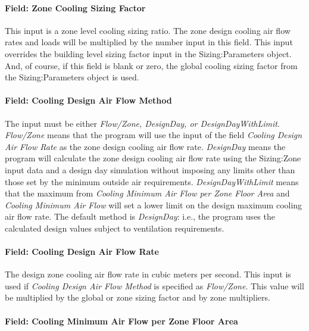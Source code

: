\paragraph{Field: Zone Cooling Sizing Factor}\label{field-zone-cooling-sizing-factor}

This input is a zone level cooling sizing ratio. The zone design cooling air flow rates and loads will be multiplied by the number input in this field. This input overrides the building level sizing factor input in the Sizing:Parameters object. And, of course, if this field is blank or zero, the global cooling sizing factor from the Sizing:Parameters object is used.

\paragraph{Field: Cooling Design Air Flow Method}\label{field-cooling-design-air-flow-method}

The input must be either \emph{Flow/Zone, DesignDay, or DesignDayWithLimit}. \emph{Flow/Zone} means that the program will use the input of the field \emph{Cooling Design Air Flow Rate} as the zone design cooling air flow rate. \emph{DesignDay} means the program will calculate the zone design cooling air flow rate using the Sizing:Zone input data and a design day simulation without imposing any limits other than those set by the minimum outside air requirements. \emph{DesignDayWithLimit} means that the maximum from \emph{Cooling Minimum Air Flow per Zone Floor Area} and \emph{Cooling Minimum Air Flow} will set a lower limit on the design maximum cooling air flow rate. The default method is \emph{DesignDay}: i.e., the program uses the calculated design values subject to ventilation requirements.

\paragraph{Field: Cooling Design Air Flow Rate}\label{field-cooling-design-air-flow-rate}

The design zone cooling air flow rate in cubic meters per second. This input is used if \emph{Cooling Design Air Flow Method} is specified as \emph{Flow/Zone}. This value will be multiplied by the global or zone sizing factor and by zone multipliers.

\paragraph{Field: Cooling Minimum Air Flow per Zone Floor Area}\label{field-cooling-minimum-air-flow-per-zone-floor-area}


